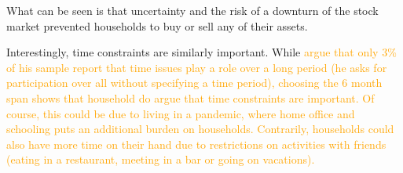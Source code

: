 \documentclass[ProjectABM]{subfiles}
\begin{document}
What can be seen is that uncertainty and the risk of a downturn of the stock market prevented households to buy or sell any of their assets. %

Interestingly, time constraints are similarly important. While \textcolor{orange}{\cite{choi_2020} argue that only 3\% of his sample report that time issues play a role over a long period (he asks for participation over all without specifying a time period), choosing the 6 month span shows that household do argue that time constraints are important. Of course, this could be due to living in a pandemic, where home office and schooling puts an additional burden on households. Contrarily, households could also have more time on their hand due to restrictions on activities with friends (eating in a restaurant, meeting in a bar or going on vacations).}



\end{document}
